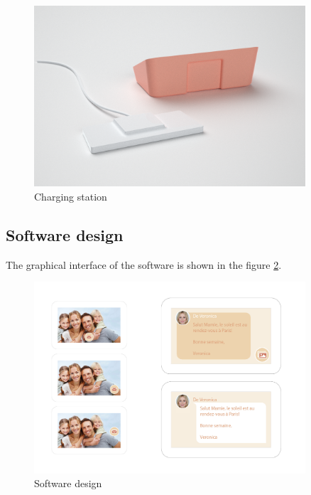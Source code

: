\begin{figure}[!htb]
    \centering
    \includegraphics[width=0.9\textwidth,keepaspectratio]{chap/designFig/VisioRender7.png}
    \caption{Charging station}
    \label{fig:charging station}
\end{figure}

\clearpage

\subsection{Software design}

The graphical interface of the software is shown in the figure \ref{fig:soft design}.

\begin{figure}[!htb]
    \centering
    \includegraphics[width=0.9\textwidth,keepaspectratio]{chap/designFig/vesta_design.jpg}
    \caption{Software design}
    \label{fig:soft design}
\end{figure}

